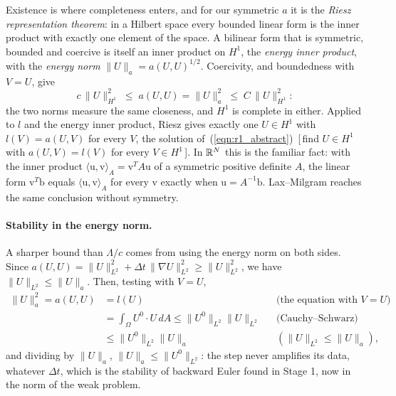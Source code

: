 Existence is where completeness enters, and for our symmetric $a$ it is the \emph{Riesz representation theorem}: in a Hilbert space every bounded linear form is the inner product with exactly one element of the space. A bilinear form that is symmetric, bounded and coercive is itself an inner product on $H^1$, the \emph{energy inner product}, with the \emph{energy norm} $\|U\|_a = a(U, U)^{1/2}$. Coercivity, and boundedness with $V = U$, give
\begin{equation*}
c\,\|U\|_{H^1}^2 \;\leq\; a(U, U) = \|U\|_a^2 \;\leq\; C\,\|U\|_{H^1}^2 :
\end{equation*}
the two norms measure the same closeness, and $H^1$ is complete in either. Applied to $l$ and the energy inner product, Riesz gives exactly one $U \in H^1$ with $l(V) = a(U, V)$ for every $V$, the solution of~(\ref{eqn:r1_abstract})~[\,find $U\in H^1$ with $a(U, V) = l(V)$ for every $V\in H^1$\,]. In $\mathbb{R}^N$ this is the familiar fact: with the inner product $\langle \mathrm u, \mathrm v\rangle_A = \mathrm v^T A\mathrm u$ of a symmetric positive definite $A$, the linear form $\mathrm v^T \mathrm b$ equals $\langle \mathrm u, \mathrm v\rangle_A$ for every $\mathrm v$ exactly when $\mathrm u = A^{-1}\mathrm b$. Lax--Milgram reaches the same conclusion without symmetry.

\paragraph{Stability in the energy norm.} A sharper bound than $\Lambda/c$ comes from using the energy norm on both sides. Since $a(U, U) = \|U\|_{L^2}^2 + \Delta t\,\|\nabla U\|_{L^2}^2 \ge \|U\|_{L^2}^2$, we have $\|U\|_{L^2} \le \|U\|_a$. Then, testing with $V = U$,
\begin{align*}
\|U\|_a^2 = a(U, U) &= l(U) && \text{(the equation with } V = U\text{)} \\
&= \int_\Omega U^0\cdot U\, dA \leq \|U^0\|_{L^2}\|U\|_{L^2} && \text{(Cauchy--Schwarz)} \\
&\leq \|U^0\|_{L^2}\|U\|_a && (\|U\|_{L^2} \le \|U\|_a) ,
\end{align*}
and dividing by $\|U\|_a$, $\|U\|_a \leq \|U^0\|_{L^2}$: the step never amplifies its data, whatever $\Delta t$, which is the stability of backward Euler found in Stage 1, now in the norm of the weak problem.

